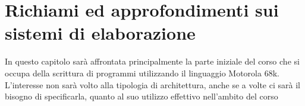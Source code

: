 \chapter{Richiami ed approfondimenti sui sistemi di
elaborazione}
In questo capitolo sarà affrontata principalmente la parte iniziale del corso che si occupa della scrittura di programmi utilizzando il linguaggio Motorola 68k. L'interesse non sarà volto alla tipologia di architettura, anche se a volte ci sarà il bisogno di specificarla, quanto al suo utilizzo effettivo nell'ambito del corso


